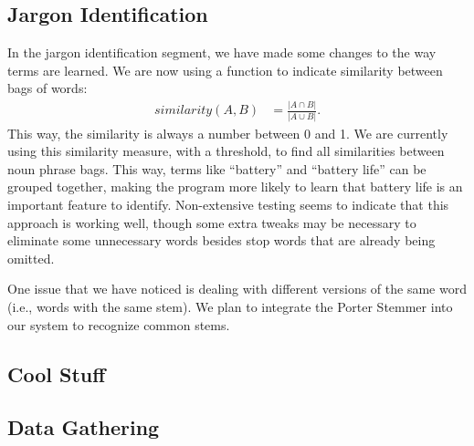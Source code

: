 \documentclass{article}
\begin{document}
\subsection{Jargon Identification} %

In the jargon identification segment, we have made some changes to the way terms are learned.  We are now using a function to indicate similarity between bags of words:\begin{align*}
	similarity(A, B) &= \frac{|A\cap B|}{|A\cup B|}.
\end{align*}This way, the similarity is always a number between 0 and 1.  We are currently using this similarity measure, with a threshold, to find all similarities between noun phrase bags.  This way, terms like ``battery'' and ``battery life'' can be grouped together, making the program more likely to learn that battery life is an important feature to identify.  Non-extensive testing seems to indicate that this approach is working well, though some extra tweaks may be necessary to eliminate some unnecessary words besides stop words that are already being omitted.

One issue that we have noticed is dealing with different versions of the same word (i.e., words with the same stem).  We plan to integrate the Porter Stemmer \cite{porter} into our system to recognize common stems.


\subsection{Cool Stuff} %




\subsection{Data Gathering} %





\tocsection


\end{document}
